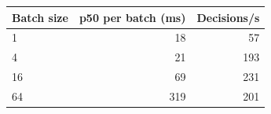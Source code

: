 \begin{tabular}{lrr}
\toprule
Batch size & p50 per batch (ms) & Decisions/s \\
\midrule
1 & 18 & 57 \\
4 & 21 & 193 \\
16 & 69 & 231 \\
64 & 319 & 201 \\
\bottomrule
\end{tabular}
